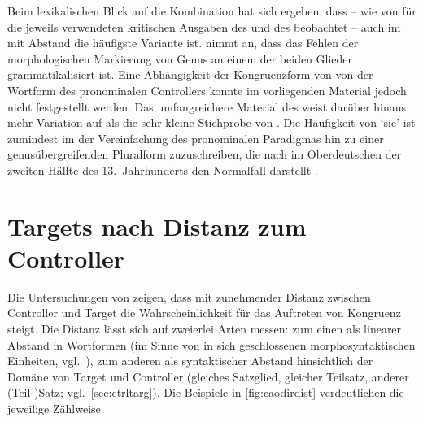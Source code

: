 Beim lexikalischen Blick auf die Kombination  hat sich ergeben,
dass -- wie von \citet{askedal1973} für die jeweils verwendeten kritischen
Ausgaben des  und des  beobachtet -- auch im
\CAO{} mit Abstand die häufigste Variante  ist.
\citeauthor{askedal1973} nimmt an, dass das Fehlen der morphologischen
Markierung von Genus an einem der beiden Glieder grammatikalisiert ist. Eine
Abhängigkeit der Kongruenzform von  von der Wortform des pronominalen
Controllers konnte im vorliegenden Material jedoch nicht festgestellt werden.
Das umfangreichere Material des \CAO{} weist darüber hinaus mehr
Variation auf als die sehr kleine Stichprobe von \citeauthor{askedal1973}. Die
Häufigkeit von  `sie' ist zumindest im \CAO{} der
Vereinfachung des pronominalen Paradigmas hin zu einer genusübergreifenden
Pluralform zuzuschreiben, die nach \citet[391--392]{ksw2} im Oberdeutschen der
zweiten Hälfte des 13.~Jahrhunderts den Normalfall darstellt \autocite[vgl.\
auch][37--39]{sparmann1961}.


\section{Targets nach Distanz zum Controller}
\label{sec:caotargdist}

Die Untersuchungen von \citet{corbett1979} zeigen, dass mit zunehmender Distanz
zwischen Controller und Target die Wahrscheinlichkeit für das Auftreten von
Kongruenz \fw{ad sensum} steigt. Die Distanz lässt sich auf zweierlei Arten
messen: zum einen als linearer Abstand in Wortformen (im Sinne von in sich
geschlossenen morphosyntaktischen Einheiten, vgl.~\cite[252--253]{bauer2000}),
zum anderen als syntaktischer Abstand hinsichtlich der Domäne von Target und
Controller (gleiches Satzglied, gleicher Teilsatz, anderer (Teil-)Satz;
vgl.~\cref{sec:ctrltarg}). Die Beispiele in \cref{fig:caodirdist} verdeutlichen
die jeweilige Zählweise.

